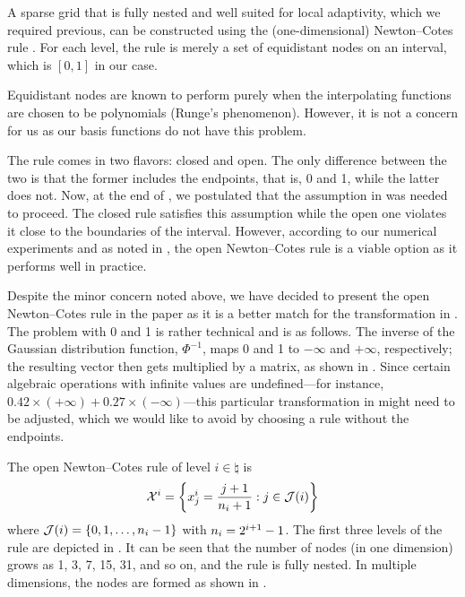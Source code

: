 A sparse grid that is fully nested and well suited for local adaptivity, which
we required previous, can be constructed using the (one-dimensional)
Newton--Cotes rule \cite{klimke2006, ma2009}. For each level, the rule is merely
a set of equidistant nodes on an interval, which is $[0, 1]$ in our case.

\begin{remark}
Equidistant nodes are known to perform purely when the interpolating functions
are chosen to be polynomials (Runge's phenomenon). However, it is not a concern
for us as our basis functions do not have this problem.
\end{remark}

The rule comes in two flavors: closed and open. The only difference between the
two is that the former includes the endpoints, that is, 0 and 1, while the
latter does not. Now, at the end of , we postulated that
the assumption in  was needed to proceed. The closed rule
satisfies this assumption while the open one violates it close to the boundaries
of the interval. However, according to our numerical experiments and as noted in
\cite{klimke2006}, the open Newton--Cotes rule is a viable option as it performs
well in practice.

Despite the minor concern noted above, we have decided to present the open
Newton--Cotes rule in the paper as it is a better match for the transformation
in . The problem with 0 and 1 is rather technical and is as
follows. The inverse of the Gaussian distribution function, $\Phi^{-1}$, maps 0
and 1 to $-\infty$ and $+\infty$, respectively; the resulting vector then gets
multiplied by a matrix, as shown in . Since certain
algebraic operations with infinite values are undefined---for instance, $0.42
\times (+\infty) + 0.27 \times (-\infty)$---this particular transformation in
 might need to be adjusted, which we would like to avoid by
choosing a rule without the endpoints.


The open Newton--Cotes rule of level $i \in \natural$ is
\[
  \mathcal{X}^i = \left\{ x^i_j = \frac{j + 1}{n_i + 1}: j \in \mathcal{J}(i) \right\}
\]
where $\mathcal{J}(i) = \left\{ 0, 1, \dots, n_i - 1 \right\}$ with $n_i = 2^{i +
1} - 1$. The first three levels of the rule are depicted in . It can
be seen that the number of nodes (in one dimension) grows as 1, 3, 7, 15, 31,
and so on, and the rule is fully nested. In multiple dimensions, the nodes are
formed as shown in .
